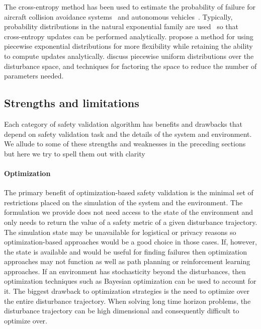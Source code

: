 The cross-entropy method has been used to estimate the probability of failure for aircraft collision avoidance systems~\cite{kim2016improving} and autonomous vehicles~\cite{okelly2018scalable,zhao2016accelerated,huang2017accelerated}. Typically, probability distributions in the natural exponential family are used~\cite{kim2016improving,okelly2018scalable,zhao2016accelerated} so that cross-entropy updates can be performed analytically. \textcite{huang2017accelerated} propose a method for using piecewise exponential distributions for more flexibility while retaining the ability to compute updates analytically. \textcite{sankaranarayanan2012falsification}  discuss piecewise uniform distributions over the disturbance space, and techniques for factoring the space to reduce the number of parameters needed.

\subsection{Strengths and limitations}

Each category of safety validation algorithm has benefits and drawbacks that depend on safety validation task and the details of the system and environment. We allude to some of these strengths and weaknesses in the preceding sections but here we try to spell them out with clarity

\paragraph{Optimization} The primary benefit of optimization-based safety validation is the minimal set of restrictions placed on the simulation of the system and the environment. The formulation we provide does not need access to the state of the environment and only needs to return the value of a safety metric of a given disturbance trajectory. The simulation state may be unavailable for logistical or privacy reasons so optimization-based approaches would be a good choice in those cases. If, however, the state is available and would be useful for finding failures then optimization approaches may not function as well as path planning or reinforcement learning approaches. If an environment has stochasticity beyond the disturbances, then optimization techniques such as Bayesian optimization can be used to account for it. The biggest drawback to optimization strategies is the need to optimize over the entire disturbance trajectory. When solving long time horizon problems, the disturbance trajectory can be high dimensional and consequently difficult to optimize over. 



